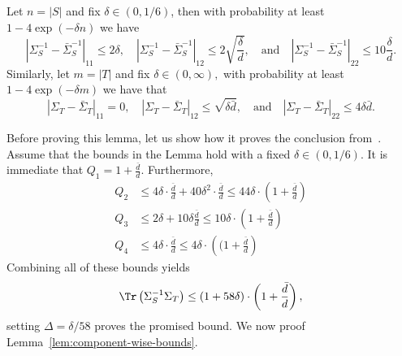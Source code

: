 \begin{lemma}\label{lem:component-wise-bounds}
    Let $n = |S|$ and fix $\delta \in (0, 1/6)$, then with probability at least $1 - 4\exp(-\delta n)$ we have  
    $$
    \left|\Sigma_S^{-1} - \bar \Sigma_S^{-1}\right|_{11} \leq 2 \delta, \quad \left|\Sigma_S^{-1} - \bar \Sigma_S^{-1}\right|_{12} \leq 2  \sqrt{\frac{\delta}{d}}, \quad \text{and}\quad \left|\Sigma_S^{-1} - \bar \Sigma_S^{-1}\right|_{22} \leq 10 \frac{\delta}{d}.
    $$
    Similarly, let $m = |T|$ and fix $\delta \in (0, \infty),$ with probability at least $ 1- 4\exp(-\delta m)$ we have that 
    $$
      \left|\Sigma_T - \bar \Sigma_T\right|_{11} = 0, \quad \left|\Sigma_T - \bar \Sigma_T\right|_{12} \leq  \sqrt{{\delta}{\bar d}}, \quad \text{and}\quad \left|\Sigma_T - \bar \Sigma_T\right|_{22} \leq 4 {\delta}{\bar d}.
    $$
\end{lemma}
Before proving this lemma, let us show how it proves the conclusion from~. Assume that the bounds in the Lemma hold with a fixed $\delta \in (0, 1/6)$. It is immediate that $Q_1 = 1 + \frac{\bar d}{d}.$ Furthermore,
\begin{align*}
    Q_2 &\leq 4 \delta \cdot \frac{\bar d}{d} + 40 \delta^2 \cdot \frac{\bar d} {d} \leq 44 \delta \cdot \left(1 + \frac{\bar d} {d}\right) \\ 
    Q_3 &\leq 2\delta + 10 \delta \frac{\bar d}{d} \leq 10 \delta \cdot \left(1+\frac{\bar d}{d}\right) \\
    Q_4 &\leq 4\delta \cdot \frac{\bar d}{d} \leq 4\delta \cdot \left((1 + \frac{\bar d}{d}\right)
\end{align*}
Combining all of these bounds yields 
$$
 \Tr\left(\Sigma_S^{-1} \Sigma_T\right) \leq (1 + 58\delta)\cdot \left(1 + \frac{\bar d}{d}\right),
$$
setting $\Delta = \delta/58$ proves the promised bound. We now proof Lemma~\ref{lem:component-wise-bounds}.
